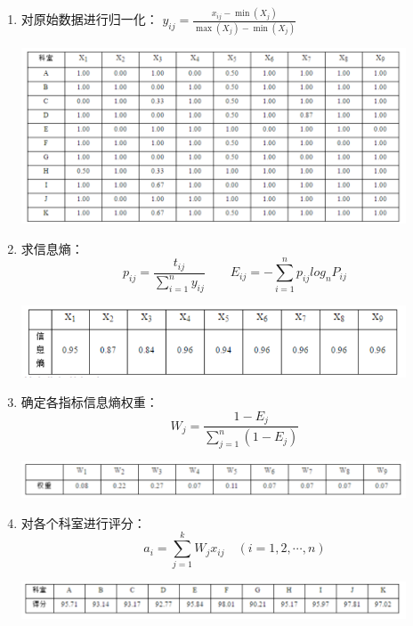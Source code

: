 \documentclass[12pt,a4paper]{article}
\begin{document}
\begin{enumerate}
  \item 对原始数据进行归一化：
  $y_{ij} = \frac{x_{ij} - \min(X_j)}{\max(X_j) - \min(X_j)}$
  \begin{center}
    \includegraphics[width = 0.9\textwidth]{figures/entropy_adjdata.png}
  \end{center}
  \item 求信息熵：
  $$p_{ij} = \frac{t_{ij}}{\sum_{i = 1}^ny_{ij}}\quad\quad E_{ij} = -\sum_{i = 1}^np_{ij}log_nP_{ij}$$
  \begin{center}
    \includegraphics[width = 0.9\textwidth]{figures/entropy_entropy.png}
  \end{center}
  \item 确定各指标信息熵权重：
  $$W_j = \frac{1 - E_{j}}{\sum_{j = 1}^n(1 - E_j)}$$
  \begin{center}
    \includegraphics[width = 0.9\textwidth]{figures/entropy_weight.png}
  \end{center}
  \item 对各个科室进行评分：
  $$a_i = \sum_{j = 1}^kW_jx_{ij}\quad (i = 1, 2, \cdots ,n)$$
  \begin{center}
    \includegraphics[width = 0.9\textwidth]{figures/entropy_finalresult.png}
  \end{center}


\end{enumerate}
\end{document}
